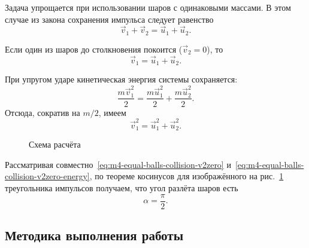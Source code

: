 \documentclass[a4paper, 12pt]{extarticle}
\begin{document}
Задача упрощается при использовании шаров с одинаковыми массами. В этом случае из закона сохранения импульса следует равенство
\begin{equation}
\label{eq:m4-equal-balls-collision}
\vec v_1 + \vec v_2 = \vec u_1 + \vec u_2.
\end{equation}

Если один из шаров до столкновения покоится ($\vec v_2
= 0$), то
\begin{equation}
\label{eq:m4-equal-balls-collision-v2zero}
\vec v_1 = \vec u_1 + \vec u_2.
\end{equation}


При упругом ударе кинетическая энергия системы сохраняется:
\[
\frac{m\vec v_1^2}{2} = \frac{m \vec u_1^2}{2} + \frac{m \vec u_2^2}{2}.
\]
Отсюда, сократив на $m/2$, имеем
\begin{equation}
\label{eq:m4-equal-balls-collision-v2zero-energy}
\vec v_1^2 = \vec u_1^2 + \vec u_2^2.
\end{equation}

\begin{figure}[t]
\begin{center}
\end{center}
\caption{Схема расчёта \label{fig:m4-momentum-triangle}}
\end{figure}

Рассматривая совместно~\eqref{eq:m4-equal-balls-collision-v2zero} и~\eqref{eq:m4-equal-balls-collision-v2zero-energy}, по теореме косинусов для изображённого на рис.~\ref{fig:m4-momentum-triangle} треугольника импульсов получаем, что угол разлёта шаров есть
\[
\alpha = \frac{\pi}{2}.
\]

\subsection{Методика выполнения работы}

\end{document}
